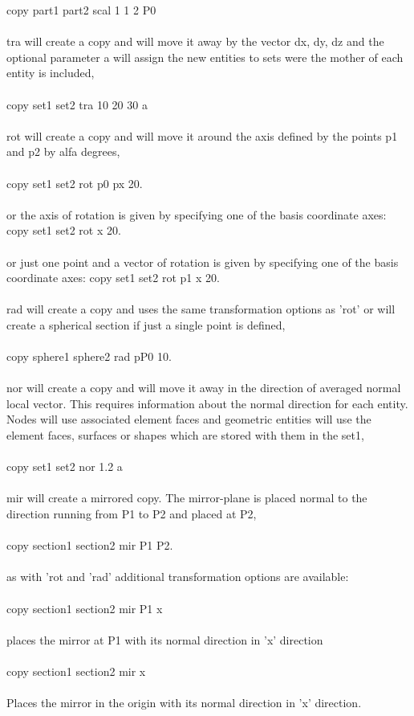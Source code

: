 \documentclass{article}
\begin{document}
copy part1 part2 scal 1 1 2 P0\\\\
tra will create a copy and will move it away by the vector dx, dy, dz and the optional parameter a will assign the new entities to sets were the mother of each entity is included,\\\\
copy set1 set2 tra 10 20 30 a\\\\
rot will create a copy and will move it around the axis defined by the points p1 and p2 by alfa degrees,\\\\
copy set1 set2 rot p0 px 20.\\\\
or the axis of rotation is given by specifying one of the basis coordinate axes:
copy set1 set2 rot x 20.\\\\
or just one point and a vector of rotation is given by specifying one of the basis coordinate axes:
copy set1 set2 rot p1 x 20.\\\\
rad will create a copy and uses the same transformation options as 'rot' or will create a spherical section if just a single point is defined,\\\\
copy sphere1 sphere2 rad pP0 10.\\\\
nor will create a copy and will move it away in the direction of averaged normal local vector. This requires information about the normal direction for each entity. Nodes will use associated element faces and geometric entities will use the element faces, surfaces or shapes which are stored with them in the set1,\\\\
copy set1 set2 nor 1.2 a\\\\
mir will create a mirrored copy. The mirror-plane is placed normal to the direction running from P1 to P2 and placed at P2,\\\\
copy section1 section2 mir P1 P2.\\\\
as with 'rot and 'rad' additional transformation options are available:\\\\
copy section1 section2 mir P1 x\\\\
places the mirror at P1 with its normal direction in 'x' direction\\\\
copy section1 section2 mir x\\\\
Places the mirror in the origin with its normal direction in 'x' direction.
\end{document}
